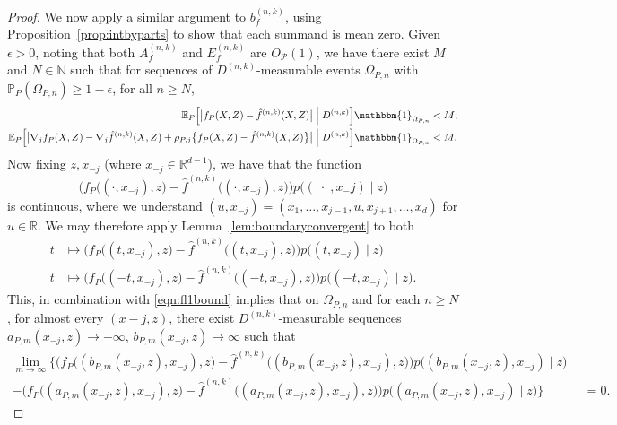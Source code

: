 \documentclass[aos]{imsart}
\newcommand{\ind}{\mathbbm{1}}
\newcommand{\pr}{\mathbb{P}}
\newcommand{\R}{\mathbb{R}}
\newcommand{\E}{\mathbb{E}}
\begin{document}
\begin{proof}
		We now apply a similar argument to $b^{(n,k)}_f$, using Proposition~\ref{prop:intbyparts} to show that each summand is mean zero. Given $\epsilon >0$, noting that both $A_f^{(n,k)}$ and $E_f^{(n,k)}$ are $O_\mathcal{P}(1)$, we have there exist $M$ and $N \in \mathbb{N}$ such that for sequences of $D^{(n,k)}$-measurable events $\Omega_{P,n}$ with $\pr_P(\Omega_{P,n}) \geq 1-\epsilon$, for all $n \geq N$,
		\begin{align}
			\E_P\Big[\big|f_{P}(X,Z) - \hat f^{(n,k)}(X,Z)\big|\;\Big|\;D^{(n,k)}  \Big] \ind_{\Omega_{P,n}} &< M;\label{eqn:fl1bound}\\
			\E_P\Big[\big|\nabla_j f_{P}(X,Z) - \nabla_j \hat f^{(n,k)}(X,Z) + \rho_{P,j}\big\{f_{P}(X,Z) - \hat f^{(n,k)}(X,Z)\big\}\big|\;\Big|\;D^{(n,k)} \Big]\ind_{\Omega_{P,n}} &< M.\label{eqn:dfrhol1bound}
		\end{align}
		Now fixing $z,x_{-j}$ (where $x_{-j} \in \R^{d-1}$), we have that the function
		\begin{equation*}
			\Big(f_{P}\big((\cdot,x_{-j}),z\big) - \hat f^{(n,k)}\big((\cdot,x_{-j}),z\big)\Big)p\big((\;\cdot\;,x{_-j}) \; \big| \; z\big)
		\end{equation*}
		is continuous, where we understand $(u,x_{-j}) = (x_1,\ldots, x_{j-1},u,x_{j+1},\ldots, x_d)$ for $u\in\R$. We may therefore apply Lemma~\ref{lem:boundaryconvergent}
		to both
		\begin{align*}
			t &\mapsto \Big(f_{P}\big((t,x_{-j}),z\big) - \hat f^{(n,k)}\big((t,x_{-j}),z\big)\Big)p\big((t,x_{-j}) \;\big|\;  z\big) \\
			t &\mapsto \Big(f_{P}\big((-t,x_{-j}),z\big) - \hat f^{(n,k)}\big((-t,x_{-j}),z\big)\Big)p\big((-t,x_{-j}) \;\big|\;  z\big).
		\end{align*}
		This, in combination with \eqref{eqn:fl1bound} implies that on $\Omega_{P,n}$ and for each $n \geq N$, for almost every $(x-j, z)$, there exist $D^{(n,k)}$-measurable sequences $a_{P,m}(x_{-j},z) \to - \infty$, $b_{P,m}(x_{-j},z) \to \infty$ such that
		\begin{align}
			\lim_{m\to\infty} \bigg\{\Big(f_{P}\big((b_{P,m}(x_{-j},z),x_{-j}),z\big) - \hat f^{(n,k)}\big((b_{P,m}(x_{-j},z),x_{-j}),z\big)\Big)p\big((b_{P,m}(x_{-j},z),x_{-j}) \;\big|\;  z\big) \phantom{\bigg\}}&\nonumber \\
			- \big(f_{P}\big((a_{P,m}(x_{-j},z),x_{-j}),z\big) - \hat f^{(n,k)}\big((a_{P,m}(x_{-j},z),x_{-j}),z\big)\Big)p\big((a_{P,m}(x_{-j},z),x_{-j}) \;\big|\;  z\big)\bigg\} &= 0. \label{eqn:ferrorboundaryconvergent}
		\end{align}

\end{proof}
\end{document}
